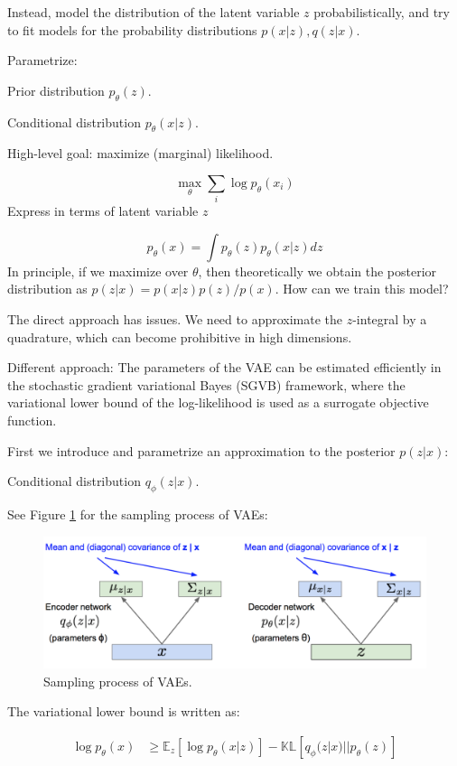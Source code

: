 \documentclass[english]{article}
\begin{document}
Instead, model the distribution of the latent variable $z$ probabilistically, and try to fit models for the probability distributions $p(x|z), q(z|x)$.

Parametrize:
\benum 
\item  Prior distribution $p_\theta(z)$.
\item  Conditional distribution $p_\theta(x|z)$.
\eenum 

High-level goal: maximize (marginal) likelihood. 

$$\max_\theta \sum_i \log p_\theta(x_i) 
$$
Express in terms of latent variable $z$

$$p_\theta(x) 
= \int 
p_\theta(z)p_\theta(x|z)dz
$$
In principle, if we maximize over $\theta$, then theoretically we obtain the posterior distribution as $p(z|x) = p(x|z)p(z)/p(x)$. How can we train this model?

The direct approach has issues. We need to approximate the $z$-integral by a quadrature, which can become prohibitive in high dimensions.

\item Different approach:
The parameters of the VAE can be estimated efficiently in the stochastic gradient variational Bayes (SGVB) framework, where the variational lower bound of the log-likelihood is used as a surrogate objective function. 

First we introduce and parametrize an approximation to the posterior $p(z|x)$:
\benum 
\item  Conditional distribution $q_\phi(z|x)$.
\eenum 

See Figure \ref{svae} for the sampling process of VAEs:
\begin{figure}[H]\centering
\includegraphics[width=12cm]{VAE_P1}
\caption{Sampling process of VAEs.}
   \label{svae}
\end{figure}




The variational lower bound is written as:

\begin{align*}
	\log p_{\theta}(x) %
	&\geq\mathbb{E}_{z}[\log p_{\theta}(x|z)] - \mathbb{KL}[q_{\phi}(z|x)||p_{\theta}(z)]
\end{align*}
\end{document}
